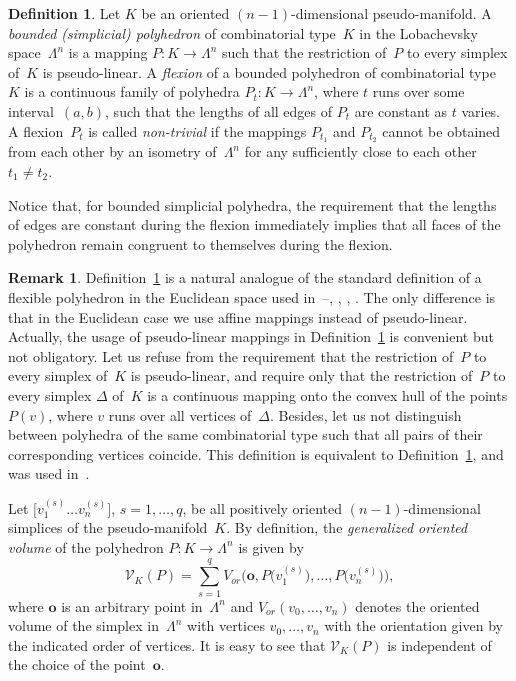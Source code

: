 \documentclass[reqno,tbtags,12pt]{amsart}
\numberwithin{equation}{section}
\newcommand{\CV}{\mathcal{V}}
\newcommand{\bo}{\mathbf{o}}
\theoremstyle{definition}
\newtheorem{defin}[theorem]{Definition}
\newtheorem{remark}[theorem]{Remark}
\begin{document}
\begin{defin}\label{defin_simplic}
Let $K$ be an oriented $(n-1)$-dimensional pseudo-manifold. A \textit{bounded \textnormal{(}simplicial\textnormal{)}  polyhedron\/} of combinatorial type\/~$K$ in the Lobachevsky space~$\Lambda^n$ is a mapping $ P\colon K\to\Lambda^n$ such that the restriction of~$ P$ to every simplex of~$K$ is pseudo-linear. A \textit{flexion\/} of a bounded  polyhedron of combinatorial type\/~$K$ is a continuous family of polyhedra $P_t\colon K\to\Lambda^n$, where $t$ runs over some interval~$(a,b)$, such that the lengths of all edges of $P_t$ are constant as $t$ varies.  A flexion~$P_t$ is called \textit{non-trivial\/} if the mappings $P_{t_1}$ and $P_{t_2}$ cannot be obtained from each other by an isometry of~$\Lambda^n$ for any  sufficiently close to each other $t_1\ne t_2$. 
\end{defin}

Notice that, for bounded simplicial  polyhedra, the requirement that the lengths of edges are constant during the flexion immediately implies that all faces of the polyhedron remain congruent to themselves during the flexion.


\begin{remark}\label{remark_variant}
Definition~\ref{defin_simplic} is a natural analogue of the standard definition of a flexible polyhedron in the Euclidean space used in~\cite{Sab96}--\cite{Sab98b}, \cite{CSW97}, \cite{Gai11}, \cite{Gai12}. The only difference is that in  the Euclidean case we use affine mappings instead of pseudo-linear. Actually, the usage of pseudo-linear mappings in Definition~\ref{defin_simplic} is convenient but not obligatory. Let us refuse from the requirement that the restriction of~$P$ to every simplex of~$K$ is pseudo-linear, and require only that the restriction of~$P$ to every simplex $\Delta$ of~$K$ is a continuous mapping onto  the convex hull of the points $ P(v)$, where $v$ runs over all vertices of~$\Delta$. Besides, let us not distinguish between polyhedra of the same combinatorial type such that all pairs of their corresponding vertices coincide. This definition is equivalent to Definition~\ref{defin_simplic}, and was used in~\cite{Gai15}.
\end{remark}

Let $\bigl[v_1^{(s)}\ldots v_n^{(s)}\bigr]$, $s=1,\ldots,q$, be all positively oriented $(n-1)$-dimensional simplices of the pseudo-manifold~$K$.  By definition, the \textit{generalized oriented volume\/} of the polyhedron $ P\colon K\to\Lambda^n$ is given by
\begin{equation}\label{eq_gen_vol}
\CV_K( P)=\sum_{s=1}^qV_{or}\bigl(\bo, P\bigl(v_1^{(s)}\bigr),\ldots, P\bigl(v_n^{(s)}\bigr)\bigr),
\end{equation}
where $\bo$ is an arbitrary point in~$\Lambda^n$ and $V_{or}(v_0,\ldots,v_n)$ denotes the oriented volume of the simplex in~$\Lambda^n$ with vertices $v_0,\ldots,v_n$ with the orientation given by the indicated order of vertices. It is easy to see that $\CV_K( P)$ is independent of the choice of the point~$\bo$. 
\end{document}
